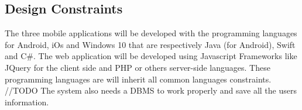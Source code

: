 \subsection{Design Constraints}
The three mobile applications will be developed with the programming languages for Android, iOs and Windows 10 that are respectively Java (for Android), Swift and C\#. The web application will be developed using Javascript Frameworks like JQuery for the client side and PHP or others server-side languages.
These programming languages are will inherit all common languages constraints. //TODO
The system also needs a DBMS to work properly and save all the users information.